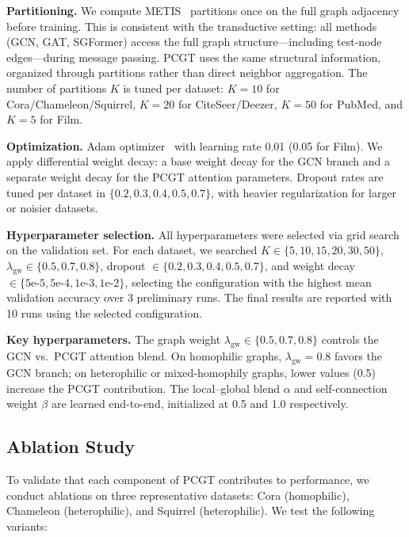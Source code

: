 \textbf{Partitioning.} We compute METIS~\citep{karypis1998metis} partitions once on the full graph adjacency before training. This is consistent with the transductive setting: all methods (GCN, GAT, SGFormer) access the full graph structure---including test-node edges---during message passing. PCGT uses the same structural information, organized through partitions rather than direct neighbor aggregation. The number of partitions $K$ is tuned per dataset: $K=10$ for Cora/Chameleon/Squirrel, $K=20$ for CiteSeer/Deezer, $K=50$ for PubMed, and $K=5$ for Film.

\textbf{Optimization.} Adam optimizer~\citep{kingma2015adam} with learning rate 0.01 (0.05 for Film). We apply differential weight decay: a base weight decay for the GCN branch and a separate weight decay for the PCGT attention parameters. Dropout rates are tuned per dataset in $\{0.2, 0.3, 0.4, 0.5, 0.7\}$, with heavier regularization for larger or noisier datasets.

\textbf{Hyperparameter selection.} All hyperparameters were selected via grid search on the validation set. For each dataset, we searched $K \in \{5, 10, 15, 20, 30, 50\}$, $\lambda_{\text{gw}} \in \{0.5, 0.7, 0.8\}$, dropout $\in \{0.2, 0.3, 0.4, 0.5, 0.7\}$, and weight decay $\in \{5\text{e-}5, 5\text{e-}4, 1\text{e-}3, 1\text{e-}2\}$, selecting the configuration with the highest mean validation accuracy over 3 preliminary runs. The final results are reported with 10 runs using the selected configuration.

\textbf{Key hyperparameters.} The graph weight $\lambda_{\text{gw}} \in \{0.5, 0.7, 0.8\}$ controls the GCN vs.\ PCGT attention blend. On homophilic graphs, $\lambda_{\text{gw}}=0.8$ favors the GCN branch; on heterophilic or mixed-homophily graphs, lower values (0.5) increase the PCGT contribution. The local--global blend $\alpha$ and self-connection weight $\beta$ are learned end-to-end, initialized at 0.5 and 1.0 respectively.

\subsection{Ablation Study}
\label{sec:ablation}

To validate that each component of PCGT contributes to performance, we conduct ablations on three representative datasets: Cora (homophilic), Chameleon (heterophilic), and Squirrel (heterophilic). We test the following variants:


